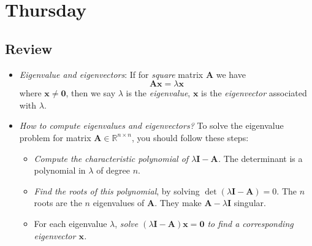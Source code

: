 
\section{Thursday}
\subsection{Review}
\begin{itemize}
\item
\emph{Eigenvalue and eigenvectors}:
If for \emph{square} matrix $\bm A$ we have
\[
\bm{Ax}=\lambda\bm x
\]
where $\bm x\ne\bm 0$, then we say $\lambda$ is the \textit{eigenvalue}, $\bm x$ is the \textit{eigenvector} associated with $\lambda$.
\item
\emph{How to compute eigenvalues and eigenvectors?}
To solve the eigenvalue problem for matrix $\bm A\in\mathbb{R}^{n\times n}$, you should follow these steps:
\begin{itemize}
\item
\textit{Compute the characteristic polynomial of $\lambda\bm I-\bm A$.} The determinant is a polynomial in $\lambda$ of degree $n$.
\item
\textit{Find the roots of this polynomial}, by solving $\det(\lambda\bm I-\bm A)=0$. The $n$ roots are the $n$ eigenvalues of $\bm A$. They make $\bm A-\lambda\bm I$ singular.
\item
For each eigenvalue $\lambda$, \textit{solve $(\lambda\bm I-\bm A)\bm x=\bm 0$ to find a corresponding eigenvector $\bm x$.}
\end{itemize}
\end{itemize}

